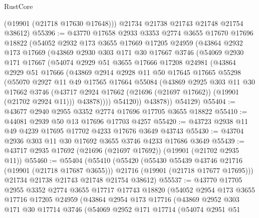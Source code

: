 \begin{lexlean}{RustCore}
\begin{coremodule}
        (@19901 (@21718 @17630 @17648)))
      @21734
      @21738
      @21743
      @21748
      @21754
      @38612)
@55396 := @43770
    @17658
    @2933
    @3353
    @2774
    @3655
    @17670
    @17696
    @18822
    (@54052
      @2932
      @173
      @3655
      @17669
      @17205
      @24959
      (@43864
        @2932
        @173
        @17669
        (@43869
          @2930
          @303
          @171
          @30
          @17667
          @3746
          (@54069
            @2930
            @171
            @17667
            (@54074
              @2929
              @51
              @3655
              @17666
              @17208
              @24981
              (@43864
                @2929
                @51
                @17666
                (@43869
                  @2914
                  @2928
                  @11
                  @50
                  @17645
                  @17665
                  @55298
                  (@55070
                    @2927
                    @11
                    @49
                    @17565
                    @17664
                    @55084
                    (@43869
                      @2925
                      @303
                      @11
                      @30
                      @17662
                      @3746
                      (@43717 @2924 @17662 (@21696 (@21697 @17662)) (@19901 (@21702 @2924 @11)))
                      @43878))))
              @54120))
          @43878))
      @54129)
@55404 := @43677 @2940 @2955 @3352 @2774 @17696 @17705 @3655 @18822
@55410 := @44081 @2939 @50 @13 @17696 @17703 @4257
@55420 := @43723 @2938 @11 @49 @4239 @17695 @17702 @4233 @17676 @3649 @43743
@55430 := @43704 @2936 @303 @11 @30 @17692 @3655 @3746 @4233 @17686 @3649
@55439 := @43717 @2935 @17692 (@21696 (@21697 @17692)) (@19901 (@21702 @2935 @11))
@55460 := @55404
    (@55410
      (@55420
        (@55430 @55439 @43746 @21716 (@19901 (@21718 @17687 @3655)))
        @21716
        (@19901 (@21718 @17677 @17695)))
      @21734
      @21738
      @21743
      @21748
      @21754
      @38612)
@55537 := @43770
    @17705
    @2955
    @3352
    @2774
    @3655
    @17717
    @17743
    @18820
    (@54052
      @2954
      @173
      @3655
      @17716
      @17205
      @24959
      (@43864
        @2954
        @173
        @17716
        (@43869
          @2952
          @303
          @171
          @30
          @17714
          @3746
          (@54069
            @2952
            @171
            @17714
            (@54074
              @2951
              @51

\end{coremodule}
\end{lexlean}
